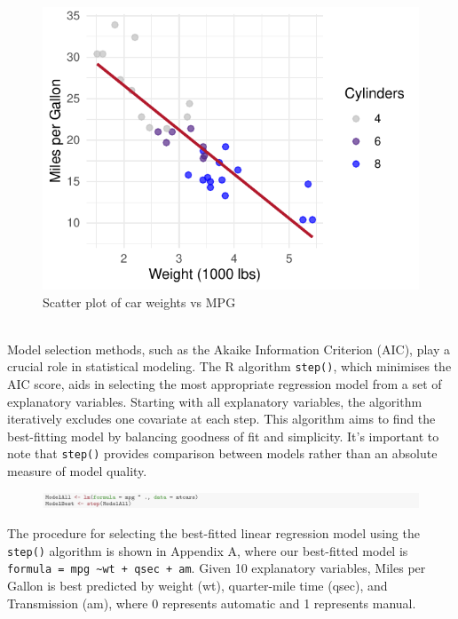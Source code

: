 \documentclass{article}\usepackage[]{graphicx}\usepackage[]{xcolor}
\makeatletter
\def\maxwidth{ %
  \ifdim\Gin@nat@width>\linewidth
    \linewidth
  \else
    \Gin@nat@width
  \fi
}
\newenvironment{knitrout}{}{} %
\makeatother
\begin{document}
\begin{knitrout}\scriptsize
{}\color{fgcolor}\begin{figure}[H]

{\centering \includegraphics[width=\maxwidth]{figure/beamer-scatter-plot-1} 

}

\caption[Scatter plot of car weights vs MPG]{Scatter plot of car weights vs MPG}\label{fig:scatter-plot}
\end{figure}

\end{knitrout}
\noindent 
\\Model selection methods, such as the Akaike Information Criterion (AIC), play a crucial role in statistical modeling. The R algorithm \texttt{step()}, which minimises the AIC score, aids in selecting the most appropriate regression model from a set of explanatory variables. Starting with all explanatory variables, the algorithm iteratively excludes one covariate at each step. This algorithm aims to find the best-fitting model by balancing goodness of fit and simplicity. It's important to note that \texttt{step()} provides comparison between models rather than an absolute measure of model quality.\\

\begin{figure}[H]
    \centering
    \includegraphics[width=1\textwidth]{codeshoot.png}
    \label{fig:codeshoot}
\end{figure}
\noindent
The procedure for selecting the best-fitted linear regression model using the \texttt{step()} algorithm is shown in Appendix A, where our best-fitted model is \texttt{formula = mpg \textasciitilde wt + qsec + am}. Given 10 explanatory variables, Miles per Gallon is best predicted by weight (wt), quarter-mile time (qsec), and Transmission (am), where 0 represents automatic and 1 represents manual.\\
\noindent
\end{document}
